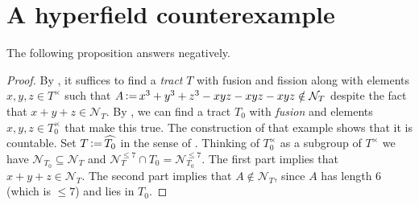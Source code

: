 \documentclass[reqno]{amsart}
\newtheorem{Prop}[Thm]{Proposition}
\theoremstyle{definition}
\theoremstyle{remark}
\newcommand{\Nc}{\mathcal{N}}
\DeclareMathOperator{\deq}{\vcentcolon=}
\begin{document}
\section{A hyperfield counterexample}\label{sec:counterexample}
The following proposition answers  negatively.
\begin{proof}
    By , it suffices to find a \emph{tract} $T$ with fusion and fission along with elements
    $x,y,z \in T^{\times}$ such that 
    ${A \deq x^3 + y^3 + z^3 - xyz - xyz - xyz \notin \mathcal{N}_T}$ despite the fact that $x+y+z \in \mathcal{N}_T$. By , we can find a tract $T_0$ with \emph{fusion} and elements $x, y, z \in T^{\times}_0$ that make this true. The construction of that example shows that it is countable. Set $T \deq \widehat{T_0}$ in the sense of .  Thinking of $T_0^{\times}$ as a subgroup of $T^{\times}$ we have $\Nc_{T_0} \subseteq \Nc_{T}$ and $\Nc_{T}^{\leq 7} \cap T_0 = \Nc_{T_0}^{\leq 7}$. 
    The first part implies that $x+y+z \in \Nc_{T}$.
    The second part implies that $A \notin \mathcal{N}_T$, since 
    $A$ has length $6$ (which is $\leq 7$) and lies in $T_0$.
\end{proof}
\end{document}

